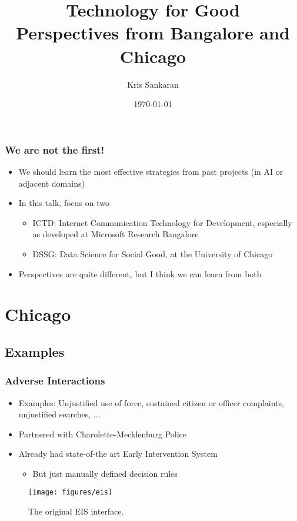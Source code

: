 \documentclass[10pt,mathserif]{beamer}
\title{\large \bfseries Technology for Good\\ Perspectives from Bangalore
  and Chicago}
\author{Kris Sankaran\\[3ex]}
\date{\today}
\begin{document}
\maketitle

\begin{frame}
  \frametitle{We are not the first!}
  \begin{itemize}
  \item We should learn the most effective strategies from past projects (in AI
    or adjacent domains)
  \item In this talk, focus on two
    \begin{itemize}
    \item ICTD: Internet Communication Technology for Development, especially as
      developed at Microsoft Research Bangalore
    \item DSSG: Data Science for Social Good, at the University of Chicago
    \end{itemize}
  \item Perspectives are quite different, but I think we can learn from both
  \end{itemize}
\end{frame}

\section{Chicago}
\label{sec:chicago}
\subsection{Examples}

\begin{frame}
  \frametitle{Adverse Interactions}
  \begin{itemize}
  \item Examples: Unjustified use of force, sustained citizen or officer
    complaints, unjustified searches, ...
  \item Partnered with Charolette-Mecklenburg Police
  \item Already had state-of-the art Early Intervention System
    \begin{itemize}
    \item But just manually defined decision rules
    \end{itemize}
  \end{itemize}
\begin{figure}[ht]
  \centering
  \texttt{[image: figures/eis]}
  \caption{The original EIS interface.\label{fig:label} }
\end{figure}

\end{frame}
\end{document}
